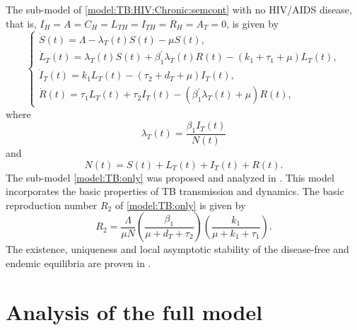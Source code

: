 \documentclass{my_aims}
\theoremstyle{definition}
\begin{document}
The sub-model of \eqref{model:TB:HIV:Chronic:semcont}
with no HIV/AIDS disease, that is,
$I_H = A = C_H = L_{TH} = I_{TH}= R_{H} = A_T = 0$, is given by
\begin{equation}
\label{model:TB:only}
\begin{cases}
\dot{S}(t) = \Lambda - \lambda_T(t) S(t) - \mu S(t),\\[0.2 cm]
\dot{L}_T(t) = \lambda_T(t) S(t) + \beta^{'}_1 \lambda_T(t) R(t) - (k_1 + \tau_1 + \mu)L_T(t),\\[0.2 cm]
\dot{I}_T(t) = k_1 L_T(t) - (\tau_2 +d_T +\mu)I_T(t), \\[0.2 cm]
\dot{R}(t) = \tau_1 L_T(t) + \tau_2 I_T(t) - (\beta^{'}_1 \lambda_T(t) + \mu) R(t),
\end{cases}
\end{equation}
where
\begin{equation*}
\lambda_T(t) = \frac{\beta_1 I_T(t)}{N(t)}
\end{equation*}
and
\begin{equation*}
N(t) = S(t) + L_T(t) + I_T(t) + R(t).
\end{equation*}
The sub-model \eqref{model:TB:only} was proposed and analyzed in \cite{Castillo_Chavez_1997}.
This model incorporates the basic properties of TB transmission and dynamics.
The basic reproduction number $R_2$ of \eqref{model:TB:only} is given by
\begin{equation}
\label{eq:brn:R2}
R_2 = \frac{\Lambda}{\mu N} \left(\frac{\beta_1}{\mu + d_T + \tau_2} \right)
\left( \frac{k_1}{\mu + k_1 + \tau_1}\right).
\end{equation}
The existence, uniqueness and local asymptotic stability of the disease-free
and endemic equilibria are proven in \cite[Theorem~1]{Castillo_Chavez_1997}.

\section{Analysis of the full model}
\label{sec:fullmodel}
\end{document}

